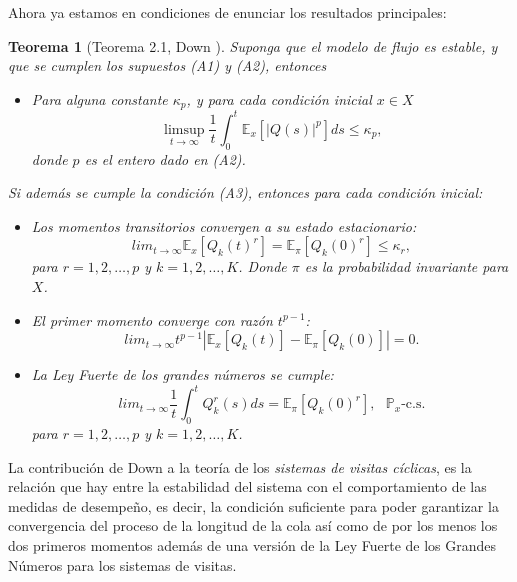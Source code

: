 \documentclass{article}
\newtheorem{Teo}{Teorema}
\newcommand{\esp}{\mathbb{E}}
\newcommand{\prob}{\mathbb{P}}
\begin{document}
Ahora ya estamos en condiciones de enunciar los resultados principales:


\begin{Teo}[Teorema 2.1, Down \cite{Down}]\label{Tma2.1.Down}
Suponga que el modelo de flujo es estable, y que se cumplen los supuestos (A1) y (A2), entonces
\begin{itemize}
\item[i)] Para alguna constante $\kappa_{p}$, y para cada condici\'on inicial $x\in X$
\begin{equation}\label{Estability.Eq1}
\limsup_{t\rightarrow\infty}\frac{1}{t}\int_{0}^{t}\esp_{x}\left[|Q\left(s\right)|^{p}\right]ds\leq\kappa_{p},
\end{equation}
donde $p$ es el entero dado en (A2).
\end{itemize}
Si adem\'as se cumple la condici\'on (A3), entonces para cada condici\'on inicial:
\begin{itemize}
\item[ii)] Los momentos transitorios convergen a su estado estacionario:
 \begin{equation}\label{Estability.Eq2}
lim_{t\rightarrow\infty}\esp_{x}\left[Q_{k}\left(t\right)^{r}\right]=\esp_{\pi}\left[Q_{k}\left(0\right)^{r}\right]\leq\kappa_{r},
\end{equation}
para $r=1,2,\ldots,p$ y $k=1,2,\ldots,K$. Donde $\pi$ es la probabilidad invariante para $X$.

\item[iii)]  El primer momento converge con raz\'on $t^{p-1}$:
\begin{equation}\label{Estability.Eq3}
lim_{t\rightarrow\infty}t^{p-1}|\esp_{x}\left[Q_{k}\left(t\right)\right]-\esp_{\pi}\left[Q_{k}\left(0\right)\right]|=0.
\end{equation}

\item[iv)] La {\em Ley Fuerte de los grandes n\'umeros} se cumple:
\begin{equation}\label{Estability.Eq4}
lim_{t\rightarrow\infty}\frac{1}{t}\int_{0}^{t}Q_{k}^{r}\left(s\right)ds=\esp_{\pi}\left[Q_{k}\left(0\right)^{r}\right],\textrm{ }\prob_{x}\textrm{-c.s.}
\end{equation}
para $r=1,2,\ldots,p$ y $k=1,2,\ldots,K$.
\end{itemize}
\end{Teo}

La contribuci\'on de Down a la teor\'ia de los {\emph {sistemas de visitas c\'iclicas}}, es la relaci\'on que hay entre la estabilidad del sistema con el comportamiento de las medidas de desempe\~no, es decir, la condici\'on suficiente para poder garantizar la convergencia del proceso de la longitud de la cola as\'i como de por los menos los dos primeros momentos adem\'as de una versi\'on de la Ley Fuerte de los Grandes N\'umeros para los
sistemas de visitas.
\end{document}
